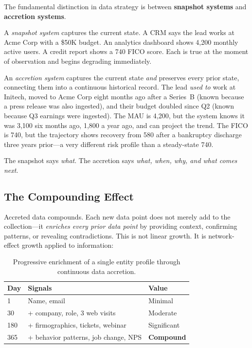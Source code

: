 \documentclass[11pt,twocolumn]{article}
\begin{document}
The fundamental distinction in data strategy is between \textbf{snapshot systems} and \textbf{accretion systems}.

A \emph{snapshot system} captures the current state. A CRM says the lead works at Acme Corp with a \$50K budget. An analytics dashboard shows 4,200 monthly active users. A credit report shows a 740 FICO score. Each is true at the moment of observation and begins degrading immediately.

An \emph{accretion system} captures the current state \emph{and} preserves every prior state, connecting them into a continuous historical record. The lead \emph{used to} work at Initech, moved to Acme Corp eight months ago after a Series~B (known because a press release was also ingested), and their budget doubled since Q2 (known because Q3 earnings were ingested). The MAU is 4,200, but the system knows it was 3,100 six months ago, 1,800 a year ago, and can project the trend. The FICO is 740, but the trajectory shows recovery from 580 after a bankruptcy discharge three years prior---a very different risk profile than a steady-state 740.

The snapshot says \emph{what}. The accretion says \emph{what, when, why, and what comes next}.

\subsection{The Compounding Effect}

Accreted data compounds. Each new data point does not merely add to the collection---it \emph{enriches every prior data point} by providing context, confirming patterns, or revealing contradictions. This is not linear growth. It is network-effect growth applied to information:

\begin{table}[H]
\centering
\small
\begin{tabular}{@{}lll@{}}
\toprule
\textbf{Day} & \textbf{Signals} & \textbf{Value} \\
\midrule
1   & Name, email                              & Minimal \\
30  & + company, role, 3 web visits             & Moderate \\
180 & + firmographics, tickets, webinar         & Significant \\
365 & + behavior patterns, job change, NPS      & \textbf{Compound} \\
\bottomrule
\end{tabular}
\caption{Progressive enrichment of a single entity profile through continuous data accretion.}
\label{tab:compounding}
\end{table}
\end{document}
